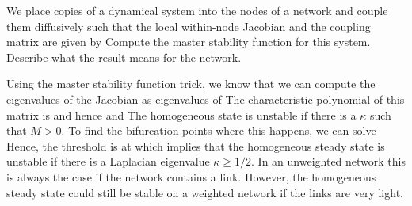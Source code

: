 

We place copies of a dynamical system into the nodes of a network and couple them diffusively such that the local within-node Jacobian and the coupling matrix are given by
Compute the master stability function for this system. Describe what the result means for the network. 

\solution
Using the master stability function trick, we know that we can compute the eigenvalues of the Jacobian as eigenvalues of  
The characteristic polynomial of this matrix is 
and hence
and 
The homogeneous state is unstable if there is a $\kappa$ such that $M>0$. To find the bifurcation points where this happens, we can solve 
Hence, the threshold is at 
which implies that the homogeneous steady state is unstable if there is a Laplacian eigenvalue $\kappa\geq 1/2$. In an unweighted network this is always the case if the network contains a link. However, the homogeneous steady state could still be stable on a weighted network if the links are very light. 